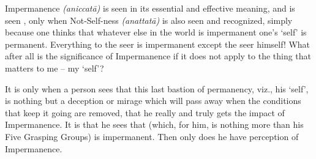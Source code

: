 Impermanence \emph{(aniccatā)} is seen in its essential and effective meaning, and is seen , only when Not-Self-ness \emph{(anattatā)} is also seen and recognized, simply because one thinks that whatever else in the world is impermanent one's `self' is permanent. Everything to the seer is impermanent except the seer himself! What after all is the significance of Impermanence if it does not apply to the  thing that matters to me -- my `self'?

It is only when a person sees that this last bastion of permanency, viz., his `self', is nothing but a deception or mirage which will pass away when the conditions that keep it going are removed, that he really and truly gets the impact of Impermanence. It is  that he sees that  (which, for him, is nothing more than his Five Grasping Groups) is impermanent. Then only does he have perception of Impermanence.
